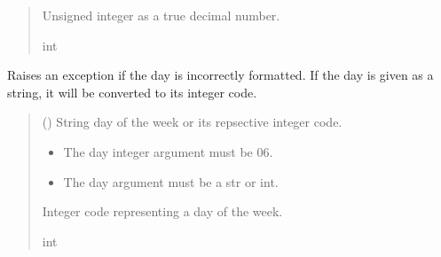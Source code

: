 \documentclass[letterpaper,10pt,english]{sphinxmanual}
\begin{document}
\begin{fulllineitems}
\begin{fulllineitems}
\begin{quote}
\begin{description}
\sphinxAtStartPar
Unsigned integer as a true decimal number.

\sphinxAtStartPar
int

\end{description}\end{quote}

\end{fulllineitems}


\begin{fulllineitems}
\label{\detokenize{PodApi.Devices:PodApi.Devices.PodDevice_8229.Pod8229._Validate_Day}}
\pysigstartsignatures
{}
\pysigstopsignatures
\sphinxAtStartPar
Raises an exception if the day is incorrectly formatted. If the day is given as         a string, it will be converted to its integer code.
\begin{quote}\begin{description}
\sphinxAtStartPar
{} (\sphinxstyleliteralemphasis{\sphinxupquote{ | }}) \textendash{} String day of the week or its repsective integer code.

\begin{itemize}
\item {} 
\sphinxAtStartPar
{} \textendash{} The day integer argument must be 0\sphinxhyphen{}6.

\item {} 
\sphinxAtStartPar
{} \textendash{} The day argument must be a str or int.

\end{itemize}

\sphinxAtStartPar
Integer code representing a day of the week.

\sphinxAtStartPar
int


\end{description}
\end{quote}
\end{fulllineitems}
\end{fulllineitems}
\end{document}
